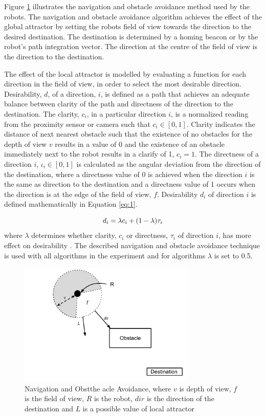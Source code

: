 Figure \ref{fig:obstacleavoidance} illustrates the navigation and obstacle avoidance method used by the robots. The navigation and obstacle avoidance algorithm achieves the effect of the global attractor by setting the robots field of view towards the direction to the desired destination. The destination is determined by a homing beacon or by the robot's path integration vector. The direction at the centre of the field of view is the direction to the destination. 

The effect of the local attractor is modelled by evaluating a function for each direction in the field of view, in order to select the most desirable direction. Desirability, $d$, of a direction, $i$, is defined as a path that achieves an adequate balance between clarity of the path and directness of the direction to the destination. The clarity,  $c_i$, in a particular direction $i$, is a normalized reading from the proximity sensor or camera such that $c_i\in[0,1]$. Clarity indicates the distance of next nearest obstacle such that the existence of no obstacles for the depth of view $v$ results in a value of 0 and the existence of an obstacle immediately next to the robot results in a clarify of 1, $c_i=1$. The directness of a direction $i$, $\iota_i\in[0,1]$ is calculated as the angular deviation from the direction of the destination, where a directness value of 0 is achieved when the direction $i$ is the same as direction to the destination and a directness value of 1 occurs when the direction is at the edge of the field of view, $f$. Desirability $d_i$ of direction $i$ is defined mathematically in Equation \ref{eq:1}.

\begin{equation}
	d_i= \lambda c_i + (1 - \lambda)\tau_i \\
	\label{eq:1}
\end{equation} where $\lambda$ determines whether clarity, $c_i$ or directness, $\tau_i$ of direction $i$, has more effect on desirability
. The described navigation and obstacle avoidance technique is used with all algorithms in the experiment and for algorithms $\lambda$ is set to 0.5.

\begin{figure}
	\centering
	\includegraphics[width=0.75\textwidth]{chapters/chapter5/figures/ObstacleAvoidance.pdf}
	\caption{Navigation and Obstthe acle Avoidance, where $v$ is depth of view, $f$ is the field of view, $R$ is the robot, $dir$ is the direction of the destination and $L$ is a possible value of local attractor}
	\label{fig:obstacleavoidance}
\end{figure}


